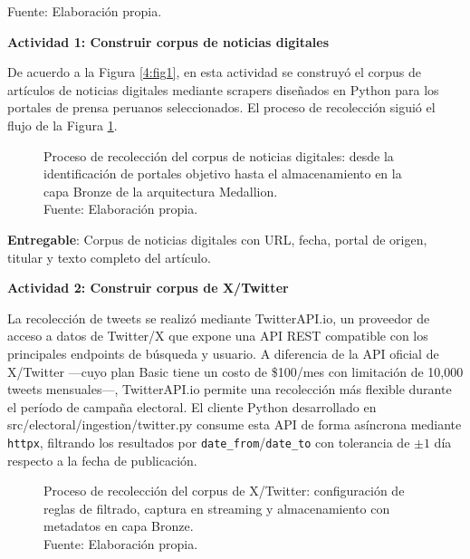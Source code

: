 \endgroup
\begin{flushleft}
    \small Fuente: Elaboración propia.
\end{flushleft}
 
\textbf{Actividad 1: Construir corpus de noticias digitales}
 
De acuerdo a la Figura \ref{4:fig1}, en esta actividad se construyó el corpus de artículos de noticias digitales mediante scrapers diseñados en Python para los portales de prensa peruanos seleccionados. El proceso de recolección siguió el flujo de la Figura \ref{4:fig4}.
 
\begin{figure}[!ht]
    \begin{center}
        \resizebox{0.85\textwidth}{!}{}
        \caption[Proceso de recolección del corpus de noticias digitales]{Proceso de recolección del corpus de noticias digitales: desde la identificación de portales objetivo hasta el almacenamiento en la capa Bronze de la arquitectura Medallion.\\
            Fuente: Elaboración propia.}
        \label{4:fig4}
    \end{center}
\end{figure}
 
\textbf{Entregable}: Corpus de noticias digitales con URL, fecha, portal de origen, titular y texto completo del artículo.
 
\textbf{Actividad 2: Construir corpus de X/Twitter}
 
La recolección de tweets se realizó mediante TwitterAPI.io, un proveedor de acceso a datos de Twitter/X que expone una API REST compatible con los principales endpoints de búsqueda y usuario. A diferencia de la API oficial de X/Twitter —cuyo plan Basic tiene un costo de \$100/mes con limitación de 10,000 tweets mensuales—, TwitterAPI.io permite una recolección más flexible durante el período de campaña electoral. El cliente Python desarrollado en src/electoral/ingestion/twitter.py consume esta API de forma asíncrona mediante \texttt{httpx}, filtrando los resultados por \texttt{date\_from}/\texttt{date\_to} con tolerancia de $\pm1$ día respecto a la fecha de publicación.

\begin{figure}[!ht]
    \begin{center}
        \resizebox{0.85\textwidth}{!}{}
        \caption[Proceso de recolección del corpus de X/Twitter mediante API Filtered Stream]{Proceso de recolección del corpus de X/Twitter: configuración de reglas de filtrado, captura en streaming y almacenamiento con metadatos en capa Bronze.\\
            Fuente: Elaboración propia.}
        \label{4:fig5}
    \end{center}
\end{figure}
 

